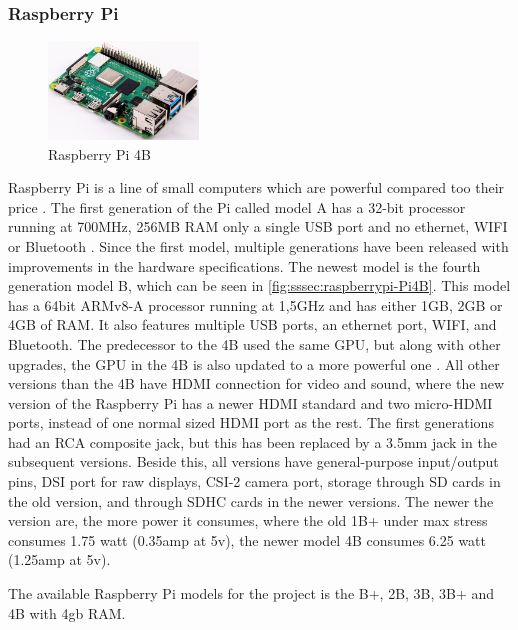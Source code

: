 \subsubsection{Raspberry Pi}
\begin{figure}[H]
  \centering
  \includegraphics[width=4cm]{images/techAnalysis/Pi4B.jpg}
  \caption{Raspberry Pi 4B \cite{RaspberryPI-figure-Pi4b}}\label{fig:sssec:raspberrypi-Pi4B}
\end{figure}
Raspberry Pi is a line of small computers which are powerful compared too their price \cite{raspberry_pi_foundation_raspberry_nodate} \cite{raspberry_pi_foundation_what_nodate}.
The first generation of the Pi called model A has a 32-bit processor running at 700MHz, 256MB RAM only a single USB port and no ethernet, WIFI or Bluetooth \cite{raspberry_pi_foundation_raspberry_nodate} \cite{raspberry_pi_foundation_bcm2835_nodate} \cite{arm_limited_arm11_nodate}.
Since the first model, multiple generations have been released with improvements in the hardware specifications.
The newest model is the fourth generation model B, which can be seen in \autoref{fig:sssec:raspberrypi-Pi4B}.
This model has a 64bit ARMv8-A processor running at 1,5GHz and has either 1GB, 2GB or 4GB of RAM.
It also features multiple USB ports, an ethernet port, WIFI, and Bluetooth.
The predecessor to the 4B used the same GPU, but along with other upgrades, the GPU in the 4B is also updated to a more powerful one \cite{raspberry_pi_foundation_raspberry_2019}.
All other versions than the 4B have HDMI connection for video and sound, where the new version of the Raspberry Pi has a newer HDMI standard and two micro-HDMI ports, instead of one normal sized HDMI port as the rest.
The first generations had an RCA composite jack, but this has been replaced by a 3.5mm jack in the subsequent versions.
Beside this, all versions have general-purpose input/output pins, DSI port for raw displays, CSI-2 camera port, storage through SD cards in the old version, and through SDHC cards in the newer versions.
The newer the version are, the more power it consumes, where the old 1B+ under max stress consumes 1.75 watt (0.35amp at 5v), the newer model 4B consumes 6.25 watt (1.25amp at 5v).
\cite{raspberry_pi_foundation_faqs_nodate}

The available Raspberry Pi models for the project is the B+, 2B, 3B, 3B+ and 4B with 4gb RAM.
